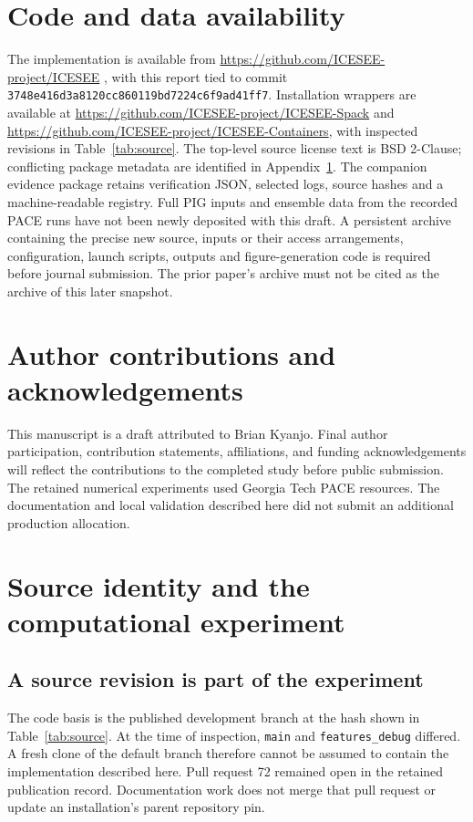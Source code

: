 \documentclass[11pt,a4paper]{article}
\newcommand{\code}[1]{\nolinkurl{#1}}
\begin{document}
\section*{Code and data availability}
The implementation is available from \url{https://github.com/ICESEE-project/ICESEE} \citep{iceseecode}, with this report tied to commit \code{3748e416d3a8120cc860119bd7224c6f9ad41ff7}. Installation wrappers are available at \url{https://github.com/ICESEE-project/ICESEE-Spack} and \url{https://github.com/ICESEE-project/ICESEE-Containers}, with inspected revisions in Table~\ref{tab:source}. The top-level source license text is BSD 2-Clause; conflicting package metadata are identified in Appendix~\ref{app:provenance}. The companion evidence package retains verification JSON, selected logs, source hashes and a machine-readable registry. Full PIG inputs and ensemble data from the recorded PACE runs have not been newly deposited with this draft. A persistent archive containing the precise new source, inputs or their access arrangements, configuration, launch scripts, outputs and figure-generation code is required before journal submission. The prior paper's archive must not be cited as the archive of this later snapshot.

\section*{Author contributions and acknowledgements}
This manuscript is a draft attributed to Brian Kyanjo. Final author participation, contribution statements, affiliations, and funding acknowledgements will reflect the contributions to the completed study before public submission. The retained numerical experiments used Georgia Tech PACE resources. The documentation and local validation described here did not submit an additional production allocation.

\appendix
\section{Source identity and the computational experiment}\label{app:provenance}
\subsection{A source revision is part of the experiment}
The code basis is the published development branch at the hash shown in Table~\ref{tab:source}. At the time of inspection, \code{main} and \code{features_debug} differed. A fresh clone of the default branch therefore cannot be assumed to contain the implementation described here. Pull request 72 remained open in the retained publication record. Documentation work does not merge that pull request or update an installation's parent repository pin.
\end{document}
